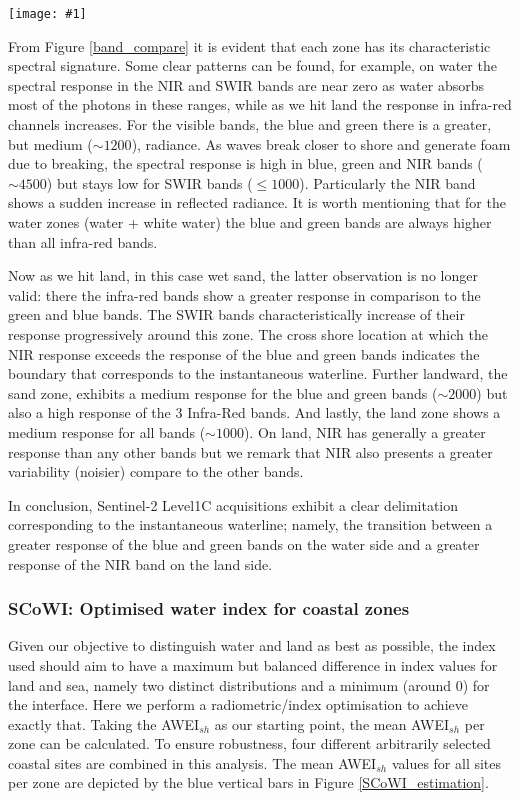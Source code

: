 \documentclass[remotesensing,technicalnote,submit,pdftex,moreauthors]{Definitions/mdpi}
\newcommand{\myfigure}[4]{
    \begin{figure*}[ht!]
        \centering
        \texttt{[image: \#1]}	 
        \caption{\itshape#2}
        \label{#3}
    \end{figure*} 
}
\begin{document}
\myfigure{img/band_compare_CAPBRETON_new2.png}{Example of the spectral response along the 5 cross-shore zones intersected by the red transect. The cross-shore distance origin is set on the red cross. The instantaneous waterline (land/water limit marker) is our target here.}{band_compare}{1}

From Figure \ref{band_compare} it is evident that each zone has its characteristic spectral signature. Some clear patterns can be found, for example, on water the spectral response in the NIR and SWIR bands are near zero as water absorbs most of the photons in these ranges, while as we hit land the response in infra-red channels increases. For the visible bands, the blue and green there is a greater, but medium ($\sim 1200$), radiance. As waves break closer to shore and generate foam due to breaking, the spectral response is high in blue, green and NIR bands ($\sim 4500$) but stays low for SWIR bands ($\le 1000$). Particularly the NIR band shows a sudden increase in reflected radiance. It is worth mentioning that for the water zones (water + white water) the blue and green bands are always higher than all infra-red bands. 

Now as we hit land, in this case wet sand, the latter observation is no longer valid: there the infra-red bands show a greater response in comparison to the green and blue bands. The SWIR bands characteristically increase of their response progressively around this zone. The cross shore location at which the NIR response exceeds the response of the blue and green bands indicates the boundary that corresponds to the instantaneous waterline. Further landward, the sand zone, exhibits a medium response for the blue and green bands ($\sim 2000$) but also a high response of the 3 Infra-Red bands. And lastly, the land zone shows a medium response for all bands ($\sim 1000$). On land, NIR has generally a greater response than any other bands but we remark that NIR also presents a greater variability (noisier) compare to the other bands.

In conclusion, Sentinel-2 Level1C acquisitions exhibit a clear delimitation corresponding to the instantaneous waterline; namely, the transition between a greater response of the blue and green bands on the water side and a greater response of the NIR band on the land side.

\subsubsection{SCoWI: Optimised water index for coastal zones}\label{SCOWI_sec}
Given our objective to distinguish water and land as best as possible, the index used should aim to have a maximum but balanced difference in index values for land and sea, namely two distinct distributions and a minimum (around 0) for the interface. Here we perform a radiometric/index optimisation to achieve exactly that. Taking the AWEI$_{sh}$ as our starting point, the mean AWEI$_{sh}$ per zone can be calculated. To ensure robustness, four different arbitrarily selected coastal sites are combined in this analysis. The mean AWEI$_{sh}$ values for all sites per zone are depicted by the blue vertical bars in Figure \ref{SCoWI_estimation}. 
\end{document}
